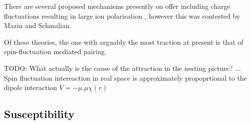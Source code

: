 There are several proposed mechanisms presently on offer including charge fluctuations resulting in large ion polarisation \cite{Berciu2009}, however this was contested by Mazin and Schmalian\cite{Mazin2009}.


Of these theories, the one with arguably the most traction at present is that of spin-fluctuation mediated pairing. 

TODO: What actually is the cause of the attraction in the nesting picture? ... Spin fluctuation intereaction in real space is approximately propoprtional to the dipole interaction $V=-\mu . \mu \chi(r)$\cite{Bergemann2003} 

\subsection{Susceptibility}
    \label{Sec:1:NestingSusceptibility}


